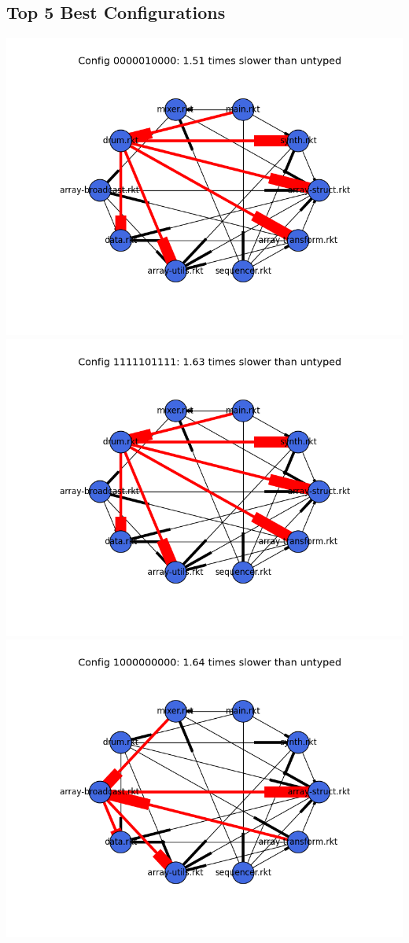 \documentclass{article}
\begin{document}
\begin{itemize}
\subsection{Top 5 Best Configurations}
\includegraphics[width=\textwidth]{funkytown-module-graph-0000010000.png}
\includegraphics[width=\textwidth]{funkytown-module-graph-1111101111.png}
\includegraphics[width=\textwidth]{funkytown-module-graph-1000000000.png}

\end{itemize}
\end{document}
